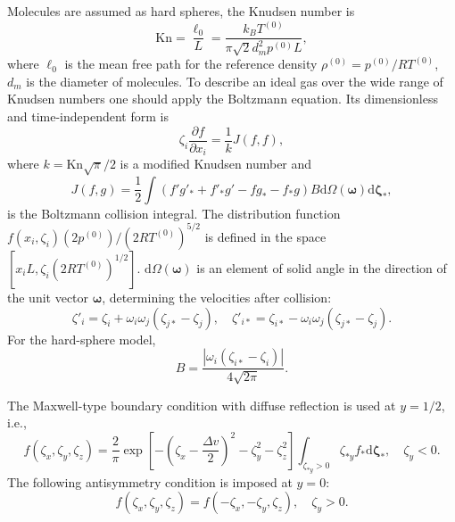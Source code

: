 \documentclass[]{elsarticle} %
\newcommand{\Kn}{\mathrm{Kn}}
\newcommand{\dd}{\mathrm{d}}
\newcommand{\pder}[2][]{\frac{\partial#1}{\partial#2}}
\newcommand{\dzeta}{\boldsymbol{\dd\zeta}}
\begin{document}
Molecules are assumed as hard spheres, the Knudsen number is
\begin{equation}\label{eq:Kn_number}
    \Kn = \frac{\ell_0}{L} = \frac{k_BT^{(0)}}{\pi\sqrt{2} d_m^2p^{(0)}L},
\end{equation}
where \(\ell_0\) is the mean free path for the reference density \(\rho^{(0)} = p^{(0)}/R T^{(0)}\),
\(d_m\) is the diameter of molecules.
To describe an ideal gas over the wide range of Knudsen numbers
one should apply the Boltzmann equation.
Its dimensionless and time-independent form is
\begin{equation}\label{eq:Boltzmann}
    \zeta_i\pder[f]{x_i} = \frac1k J(f,f),
\end{equation}
where \(k = \Kn\sqrt{\pi}/2\) is a modified Knudsen number and
\begin{equation}\label{eq:ci}
    J(f,g) = \frac12 \int (f'g'_* + f'_*g' - fg_* - f_*g) B
    \dd \Omega(\boldsymbol{\omega}) \dzeta_*,
\end{equation}
is the Boltzmann collision integral.
The distribution function \(f(x_i,\zeta_i)(2p^{(0)})/(2RT^{(0)})^{5/2}\) is defined
in the space \([x_iL, \zeta_i(2RT^{(0)})^{1/2}]\).
\(\dd \Omega(\boldsymbol{\omega})\) is an element of solid angle in the direction of the unit vector \(\boldsymbol{\omega}\),
determining the velocities after collision:
\begin{equation}\label{eq:after_collision}
    \zeta'_i = \zeta_i + \omega_i\omega_j(\zeta_{j*}-\zeta_j), \quad
    \zeta'_{i*} = \zeta_{i*} - \omega_i\omega_j(\zeta_{j*}-\zeta_j).
\end{equation}
For the hard-sphere model,
\begin{equation}\label{eq:ci_kernel}
    B = \frac{|\omega_i(\zeta_{i*}-\zeta_i)|}{4\sqrt{2\pi}}.
\end{equation}

The Maxwell-type boundary condition with diffuse reflection is used at \(y=1/2\), i.e.,
\begin{equation}\label{eq:diffuse_bc}
    f(\zeta_x,\zeta_y,\zeta_z) = \frac2{\pi} \exp\left[-\left(\zeta_x-\frac{\Delta{v}}{2}\right)^2-\zeta_y^2-\zeta_z^2\right]
        \int_{\zeta_{*y}>0}\zeta_{*y} f_* \dzeta_*, \quad \zeta_y<0.
\end{equation}
The following antisymmetry condition is imposed at \(y=0\):
\begin{equation}\label{eq:specular_bc}
    f(\zeta_x,\zeta_y,\zeta_z) = f(-\zeta_x,-\zeta_y,\zeta_z), \quad \zeta_y>0.
\end{equation}
\end{document}
